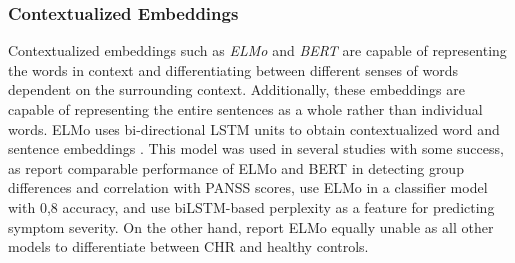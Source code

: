 \subsubsection{Contextualized Embeddings}

Contextualized embeddings such as \textit{ELMo} and \textit{BERT} are capable of representing the words in context and differentiating between different senses of words dependent on the surrounding context. Additionally, these embeddings are capable of representing the entire sentences as a whole rather than individual words. ELMo uses bi-directional LSTM units to obtain contextualized word and sentence embeddings \citep{peters2017semi}. This model was used in several studies with some success, as \citet{ryazanskaya2020thesis} report comparable performance of ELMo and BERT in detecting group differences and correlation with PANSS scores, \citet{sarzynska2021detecting} use ELMo in a classifier model with 0,8 accuracy, and \citet{srivastava2022increased} use biLSTM-based perplexity as a feature for predicting symptom severity. On the other hand, \citet{hitczenko2021understanding} report ELMo equally unable as all other models to differentiate between CHR and healthy controls.


